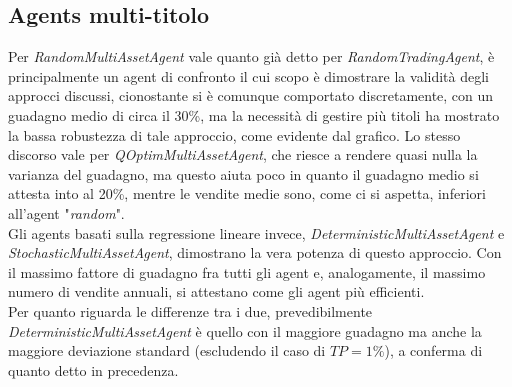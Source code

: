 \documentclass[binding=0.6cm]{sapthesis}
\begin{document}
			\subsection{Agents multi-titolo}
				Per \textit{RandomMultiAssetAgent} vale quanto già detto per \textit{RandomTradingAgent}, è principalmente un agent di confronto il cui scopo è dimostrare la validità degli approcci discussi,
				cionostante si è comunque comportato discretamente, con un guadagno medio di circa il 30\%, ma la necessità di gestire più titoli ha mostrato la bassa robustezza di tale approccio, come evidente dal
				grafico. Lo stesso discorso vale per \textit{QOptimMultiAssetAgent}, che riesce a rendere quasi nulla la varianza del guadagno, ma questo aiuta poco in quanto il guadagno medio si attesta into al
				20\%, mentre le vendite medie sono, come ci si aspetta, inferiori all'agent "\textit{random}". \\
				Gli agents basati sulla regressione lineare invece, \textit{DeterministicMultiAssetAgent} e \textit{StochasticMultiAssetAgent}, dimostrano la vera potenza di questo approccio. Con il massimo fattore
				di guadagno fra tutti gli agent e, analogamente, il massimo numero di vendite annuali, si attestano come gli agent più efficienti. \\
				Per quanto riguarda le differenze tra i due, prevedibilmente \textit{DeterministicMultiAssetAgent} è quello con il maggiore guadagno ma anche la maggiore deviazione standard (escludendo il caso di
				$TP = 1\%$), a conferma di quanto detto in precedenza.
	\backmatter
	\cleardoublepage
	\nocite{*}
	
	
\end{document}
